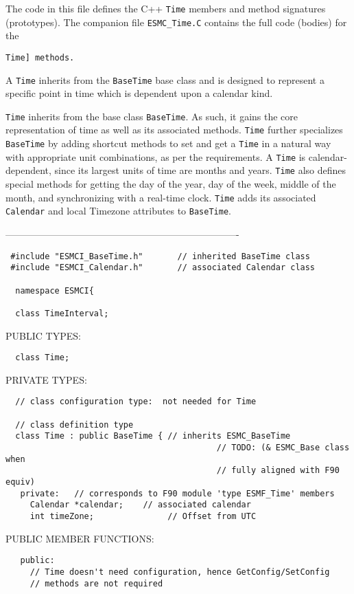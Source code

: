   
   The code in this file defines the C++ {\tt Time} members and method
   signatures (prototypes).  The companion file {\tt ESMC\_Time.C} contains
   the full code (bodies) for the {\tt Time] methods.
  
   A {\tt Time} inherits from the {\tt BaseTime} base class and is designed
   to represent a specific point in time which is dependent upon a calendar
   kind.
  
   {\tt Time} inherits from the base class {\tt BaseTime}.  As such, it gains
   the core representation of time as well as its associated methods.
   {\tt Time} further specializes {\tt BaseTime} by adding shortcut methods
   to set and get a {\tt Time} in a natural way with appropriate unit
   combinations, as per the requirements.  A {\tt Time} is calendar-dependent,
   since its largest units of time are months and years.  {\tt Time} also
   defines special methods for getting the day of the year, day of the week,
   middle of the month, and synchronizing with a real-time clock.  {\tt Time}
   adds its associated {\tt Calendar} and local Timezone attributes to
   {\tt BaseTime}.
  
  -------------------------------------------------------------------------
  
\begin{verbatim} #include "ESMCI_BaseTime.h"       // inherited BaseTime class
 #include "ESMCI_Calendar.h"       // associated Calendar class
 
  namespace ESMCI{
 
  class TimeInterval;
 \end{verbatim}{\sf PUBLIC TYPES:}
\begin{verbatim}  class Time;
 \end{verbatim}{\sf PRIVATE TYPES:}
\begin{verbatim}  // class configuration type:  not needed for Time
 
  // class definition type
  class Time : public BaseTime { // inherits ESMC_BaseTime 
                                           // TODO: (& ESMC_Base class when
                                           // fully aligned with F90 equiv)
   private:   // corresponds to F90 module 'type ESMF_Time' members 
     Calendar *calendar;    // associated calendar
     int timeZone;               // Offset from UTC
 \end{verbatim}{\sf PUBLIC MEMBER FUNCTIONS:}
\begin{verbatim} 
   public:
     // Time doesn't need configuration, hence GetConfig/SetConfig
     // methods are not required
 

\end{verbatim}}
